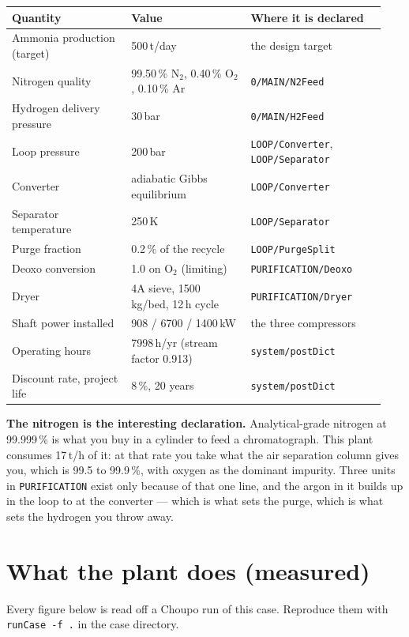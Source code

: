 \documentclass[11pt,a4paper]{article}
\begin{document}
{\small\begin{longtable}{@{}L{0.30\linewidth}L{0.30\linewidth}L{0.34\linewidth}@{}}
\toprule
\textbf{Quantity} & \textbf{Value} & \textbf{Where it is declared} \\
\midrule
\endhead
Ammonia production (target) & 500\,t/day & the design target \\
Nitrogen quality & 99.50\,\% N$_2$, 0.40\,\% O$_2$, 0.10\,\% Ar &
  \texttt{0/MAIN/N2Feed} \\
Hydrogen delivery pressure & 30\,bar & \texttt{0/MAIN/H2Feed} \\
Loop pressure & 200\,bar & \texttt{LOOP/Converter}, \texttt{LOOP/Separator} \\
Converter & adiabatic Gibbs equilibrium & \texttt{LOOP/Converter} \\
Separator temperature & 250\,K & \texttt{LOOP/Separator} \\
Purge fraction & 0.2\,\% of the recycle & \texttt{LOOP/PurgeSplit} \\
Deoxo conversion & 1.0 on O$_2$ (limiting) & \texttt{PURIFICATION/Deoxo} \\
Dryer & 4A sieve, 1500\,kg/bed, 12\,h cycle & \texttt{PURIFICATION/Dryer} \\
Shaft power installed & 908 / 6700 / 1400\,kW & the three compressors \\
Operating hours & 7998\,h/yr (stream factor 0.913) &
  \texttt{system/postDict} \\
Discount rate, project life & 8\,\%, 20 years & \texttt{system/postDict} \\
\bottomrule
\end{longtable}}

\textbf{The nitrogen is the interesting declaration.} Analytical-grade nitrogen
at 99.999\,\% is what you buy in a cylinder to feed a chromatograph. This plant
consumes 17\,t/h of it: at that rate you take what the air separation column
gives you, which is 99.5 to 99.9\,\%, with oxygen as the dominant impurity.
Three units in \texttt{PURIFICATION} exist only because of that one line, and
the argon in it builds up in the loop to  at the
converter --- which is what sets the purge, which is what sets the hydrogen
you throw away.

\section{What the plant does (measured)}

Every figure below is read off a Choupo run of this case. Reproduce them with
\texttt{runCase -f .} in the case directory.
\end{document}
